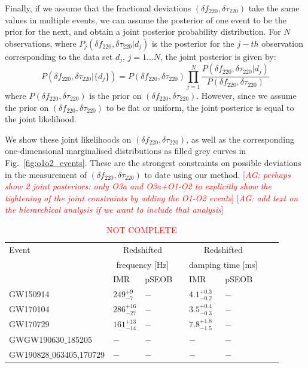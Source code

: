 \documentclass[twocolumn,prd,superscriptaddress,amsfonts,amssymb,amsmath,preprintnumbers]{revtex4-1}
\newcommand{\abhi}[1]{\textcolor{red}{[\textit{AG: #1}]}}
\newcommand{\df}[1]{\delta f_{\text{#1}}}
\newcommand{\dtau}[1]{\delta \tau_{\text{#1}}}
\begin{document}
Finally, if we assume that the fractional deviations $(\df{220}, \dtau{220})$ take the same values in multiple events, we can assume the posterior of one event to be the prior for the next, and obtain a joint posterior probability distribution. For $N$ observations, where $P_j(\df{220}, \dtau{220} | d_j)$ is the posterior for the $j-th$ observation corresponding to the data set $d_j$, $j=1...N$, the joint posterior is given by:
\begin{equation}
P(\df{220}, \dtau{220} | \{d_j\}) = P(\df{220}, \dtau{220}) \prod _{j=1}^N \frac{P(\df{220}, \dtau{220} | d_j) }{P(\df{220}, \dtau{220})}
\end{equation}
where $P(\df{220}, \dtau{220})$ is the prior on $(\df{220}, \dtau{220})$. However, since we assume the prior on $(\df{220}, \dtau{220})$ to be flat or uniform, the joint posterior is equal to the joint likelihood.

We show these joint likelihoods on $(\df{220}, \dtau{220})$, as well as the corresponding one-dimensional marginalised distributions as filled grey curves in Fig.~\ref{fig:o1o2_events}. These are the strongest constraints on possible deviations in the measurement of $(\df{220}, \dtau{220})$ to date using our method. \abhi{perhaps show 2 joint posteriors: only O3a and O3a+O1-O2 to explicitly show the tightening of the joint constraints by adding the O1-O2 events} \abhi{add text on the hierarchical analysis if we want to include that analysis}

\begin{table}
\begin{flushleft}
\begin{tabular}{llllllll}
\toprule
Event & \multicolumn{2}{c}{Redshifted} & \hphantom{X} & \multicolumn{2}{c}{Redshifted} \\
& \multicolumn{2}{c}{frequency [Hz]} & \hphantom{X} & \multicolumn{2}{c}{damping time [ms]} \\[0.075cm]
\hline
& IMR  & pSEOB & \hphantom{X} & IMR  & pSEOB \\
\hline

GW150914 &
$249^{+9}_{-7}$ &
$-$ &
\hphantom{X} &
$4.1^{+0.3}_{-0.2}$ &
$-$
\\[0.075cm]

GW170104 &
$286^{+16}_{-27}$ &
$-$ &
\hphantom{X} &
$3.5^{+0.4}_{-0.3}$ &
$-$
\\[0.075cm]

GW170729 &
$161^{+13}_{-14}$ &
$-$ &
\hphantom{X} &
$7.8^{+1.8}_{-1.5}$ &
$-$
\\[0.075cm]

GWGW190630$\_$185205 &
$-$ &
$-$ &
\hphantom{X} &
$-$ &
$-$
\\[0.075cm]

GW190828$\_$063405,170729 &
$-$ &
$-$ &
\hphantom{X} &
$-$ &
$-$
\\[0.075cm]
\hline
\bottomrule
\end{tabular}
\caption{\textcolor{red}{NOT COMPLETE}}
\label{tab:qnm_o1o2_results}
\end{flushleft}
\end{table}
\end{document}
